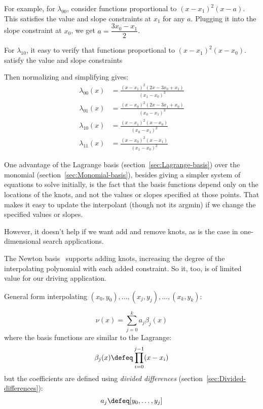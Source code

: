 For example, for $\lambda_{00}$,
consider functions proportional to 
$\left( x - x_1 \right)^2 \left( x - a \right)$.
This satisfies the value and slope constraints
at $x_1$ for any $a$.
Plugging it into the slope constraint at $x_0$,
we get $a = \dfrac{3 x_0 - x_1}{2}$.

For $\lambda_{10}$, it easy to verify that 
functions proportional to 
$\left( x - x_1 \right)^2 \left( x - x_0\right)$.
satisfy the value and slope constraints

Then normalizing and simplifying gives:
\begin{equation}
\begin{aligned}
\lambda_{00}(x) & =
\frac
{(x-x_1)^2 \left( 2 x - 3 x_0 + x_1 \right)}
{(x_1-x_0)^3}
\\
\lambda_{01}(x) & =
\frac
{(x-x_0)^2 \left( 2 x - 3 x_1 + x_0 \right)}
{(x_0-x_1)^3}
\\
\lambda_{10}(x) & =
\frac {(x-x_1)^2(x-x_0)} {(x_0-x_1)^2}
\\
\lambda_{11}(x) & =
\frac {(x-x_0)^2(x-x_1)} {(x_1-x_0)^2}
\end{aligned}
\end{equation}


One advantage of the Lagrange basis 
(section~\ref{sec:Lagrange-basis})
over the monomial (section~\ref{sec:Monomial-basis}),
besides giving a simpler system of equations to solve initially,
is the fact that the basis functions depend only on the locations
of the knots, and not the values or slopes specified at those 
points. 
That makes it easy to update the interpolant 
(though not its argmin) if we change the specified values
or slopes.
 
However, it doesn't help if we want add and remove knots,
as is the case in one-dimensional search applications.

The Newton basis~\cite{wiki:Newton-polynomial}
supports adding knots, increasing the degree
of the interpolating polynomial with each added constraint.
So it, too, is of limited value for our driving application.

General form interpolating 
$(x_{0},y_{0}),\ldots ,(x_{j},y_{j}),\ldots ,(x_{k},y_{k})$:

\begin{equation}
\nu(x) = \sum _{{j=0}}^{{k}}a_{{j}} {\beta}_{{j}}(x)
\end{equation}
where the basis functions are similar to the Lagrange:
\begin{equation}
{\beta}_{j}(x) \defeq \prod_{{i=0}}^{{j-1}}(x-x_{i})
\end{equation}
but the coefficients are defined using 
\textit{divided differences} 
(section~\ref{sec:Divided-differences}):
\begin{equation}
a_{j} \defeq [y_{0},\ldots ,y_{j}] 
\end{equation}

